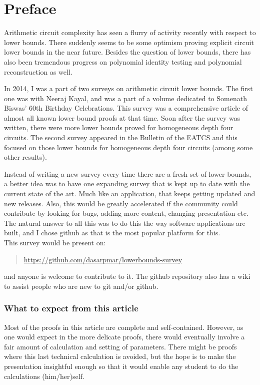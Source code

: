 \chapter*{Preface}

Arithmetic circuit complexity has seen a flurry of activity recently with respect to lower bounds. There suddenly seems to be some optimism proving explicit circuit lower bounds in the near future. Besides the question of lower bounds, there has also been tremendous progress on polynomial identity testing and polynomial reconstruction as well. 

In 2014, I was a part of two surveys on arithmetic circuit lower bounds. The first one \cite{KayalRP} was with Neeraj Kayal, and was a  part of a volume dedicated to Somenath Biswas' 60th Birthday Celebrations. This survey was a comprehensive article of almost all known lower bound proofs at that time. Soon after the survey was written, there were more lower bounds proved for homogeneous depth four circuits. The second survey \cite{rp:beatcs} appeared in the Bulletin of the EATCS and this focused on those lower bounds for homogeneous depth four circuits (among some other results). 

Instead of writing a new survey every time there are a fresh set of lower bounds, a better idea was to have one expanding survey that is kept up to date with the current state of the art. Much like an application, that keeps getting updated and new releases. Also, this would be greatly accelerated if the community could contribute by looking for bugs, adding more content, changing presentation etc. The natural answer to all this was to do this the way software applications are built, and I chose github as that is the most popular platform for this. \\

\noindent 
This survey would be present on:
\begin{quote} 
  \url{https://github.com/dasarpmar/lowerbounds-survey}
\end{quote}
and anyone is welcome to contribute to it. The github repository also has a wiki to assist people who are new to git and/or github. \\



\subsection*{What to expect from this article}

Most of the proofs in this article are complete and self-contained. However, as one would expect in the more delicate proofs, there would eventually involve a fair amount of calculation and setting of parameters. There might be proofs where this last technical calculation is avoided, but the hope is to make the presentation insightful enough so that it would enable any student to do the calculations (him/her)self.

